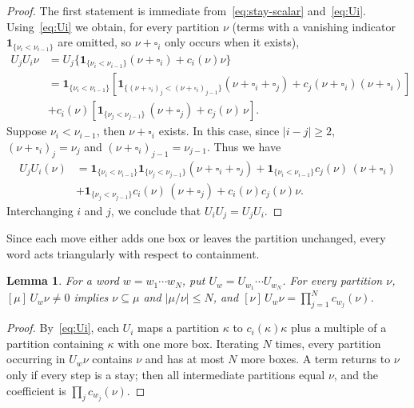 \documentclass[11pt]{amsart}
\numberwithin{equation}{section}
\newtheorem{lemma}[theorem]{Lemma}
\theoremstyle{definition}
\theoremstyle{remark}
\newcommand{\ind}{\mathbf 1}
\begin{document}
\begin{proof} 
The first statement is immediate from~\eqref{eq:stay-scalar}
and~\eqref{eq:Ui}. Using~\eqref{eq:Ui} we obtain, for every partition $\nu$ (terms with a vanishing
indicator $\ind_{\{\nu_i<\nu_{i-1}\}}$ are omitted, so $\nu+\square_i$ only occurs when it exists),
\begin{align*}
 U_jU_i\nu&=U_j\{\ind_{\{\nu_i<\nu_{i-1}\}}(\nu+\square_i)+c_i(\nu)\nu\}\\
 &= \ind_{\{\nu_i<\nu_{i-1}\}}[\ind_{\{(\nu+\square_i)_j<(\nu+\square_i)_{j-1}\}} (\nu + \square_i+\square_j) + c_j(\nu+\square_i)(\nu+\square_i) ]\\& + c_i(\nu)[ \ind_{\{\nu_j<\nu_{j-1}\}}\,(\nu+\square_j)+c_j(\nu)\,\nu ].
 \end{align*}
Suppose $\nu_i < \nu_{i-1}$, then $ \nu+\square_i$ exists. In this case, since $|i-j| \geq 2$, $(\nu+\square_i)_j=\nu_j$ and $(\nu+\square_i)_{j-1}=\nu_{j-1}$. Thus we have
\begin{align*}
U_jU_i(\nu)&=\ind_{\{\nu_i<\nu_{i-1}\}}\ind_{\{\nu_j<\nu_{j-1}\}} (\nu + \square_i+\square_j)+
\ind_{\{\nu_i<\nu_{i-1}\}}c_j(\nu)\,(\nu+\square_i)\\ &+\ind_{\{\nu_j<\nu_{j-1}\}}c_i(\nu)\,(\nu+\square_j)+c_i(\nu)c_j(\nu)\nu.
\end{align*}
Interchanging $i$ and $j$, we conclude that $U_iU_j=U_jU_i$.
\end{proof}
Since each move either adds one box or leaves the partition
unchanged, every word acts triangularly with respect to
containment.

\begin{lemma}\label{lem:triangular}
For a word $w=w_1\cdots w_N$, put $U_w=U_{w_1}\cdots U_{w_N}$. For every
partition $\nu$, $[\mu]\,U_w\nu\neq0$ implies $\nu\subseteq\mu$ and
$|\mu/\nu|\leq N$, and
$[\nu]\,U_w\nu=\prod_{j=1}^Nc_{w_j}(\nu)$.
\end{lemma}

\begin{proof}
By~\eqref{eq:Ui}, each $U_i$ maps a partition $\kappa$ to $c_i(\kappa)\kappa$
plus a multiple of a partition containing $\kappa$ with one more box.
Iterating $N$ times, every partition occurring in $U_w\nu$ contains $\nu$
and has at most $N$ more boxes. A term returns to $\nu$ only if every step
is a stay; then all intermediate partitions equal $\nu$, and the
coefficient is $\prod_jc_{w_j}(\nu)$.
\end{proof}
\end{document}
